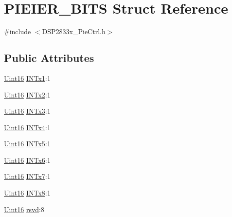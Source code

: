 \hypertarget{struct_p_i_e_i_e_r___b_i_t_s}{}\section{P\+I\+E\+I\+E\+R\+\_\+\+B\+I\+T\+S Struct Reference}
\label{struct_p_i_e_i_e_r___b_i_t_s}


{\ttfamily \#include $<$D\+S\+P2833x\+\_\+\+Pie\+Ctrl.\+h$>$}

\subsection*{Public Attributes}
\begin{DoxyCompactItemize}
\item 
\hyperlink{_d_s_p2833x___device_8h_a59a9f6be4562c327cbfb4f7e8e18f08b}{Uint16} \hyperlink{struct_p_i_e_i_e_r___b_i_t_s_a932cbdcba5b46ba6edf72e2423c9ba11}{I\+N\+Tx1}\+:1
\item 
\hyperlink{_d_s_p2833x___device_8h_a59a9f6be4562c327cbfb4f7e8e18f08b}{Uint16} \hyperlink{struct_p_i_e_i_e_r___b_i_t_s_ad9b06409d5843039d199967e1229183b}{I\+N\+Tx2}\+:1
\item 
\hyperlink{_d_s_p2833x___device_8h_a59a9f6be4562c327cbfb4f7e8e18f08b}{Uint16} \hyperlink{struct_p_i_e_i_e_r___b_i_t_s_ab8e45ea6ea52ff22e49afe79165b9417}{I\+N\+Tx3}\+:1
\item 
\hyperlink{_d_s_p2833x___device_8h_a59a9f6be4562c327cbfb4f7e8e18f08b}{Uint16} \hyperlink{struct_p_i_e_i_e_r___b_i_t_s_ae17c05f9271267a9c564c4025236b59f}{I\+N\+Tx4}\+:1
\item 
\hyperlink{_d_s_p2833x___device_8h_a59a9f6be4562c327cbfb4f7e8e18f08b}{Uint16} \hyperlink{struct_p_i_e_i_e_r___b_i_t_s_abc058f3d4105da08f9cf8191e1eb7ef0}{I\+N\+Tx5}\+:1
\item 
\hyperlink{_d_s_p2833x___device_8h_a59a9f6be4562c327cbfb4f7e8e18f08b}{Uint16} \hyperlink{struct_p_i_e_i_e_r___b_i_t_s_a63b7b969b6a6090236d3731622aa351a}{I\+N\+Tx6}\+:1
\item 
\hyperlink{_d_s_p2833x___device_8h_a59a9f6be4562c327cbfb4f7e8e18f08b}{Uint16} \hyperlink{struct_p_i_e_i_e_r___b_i_t_s_a076f4a275ff475791b818ccf217652bf}{I\+N\+Tx7}\+:1
\item 
\hyperlink{_d_s_p2833x___device_8h_a59a9f6be4562c327cbfb4f7e8e18f08b}{Uint16} \hyperlink{struct_p_i_e_i_e_r___b_i_t_s_a9baf02765efb7501fbdcbf192e2e70af}{I\+N\+Tx8}\+:1
\item 
\hyperlink{_d_s_p2833x___device_8h_a59a9f6be4562c327cbfb4f7e8e18f08b}{Uint16} \hyperlink{struct_p_i_e_i_e_r___b_i_t_s_a46e39a84bac6ce9b0cae10497c57bac0}{rsvd}\+:8
\end{DoxyCompactItemize}


